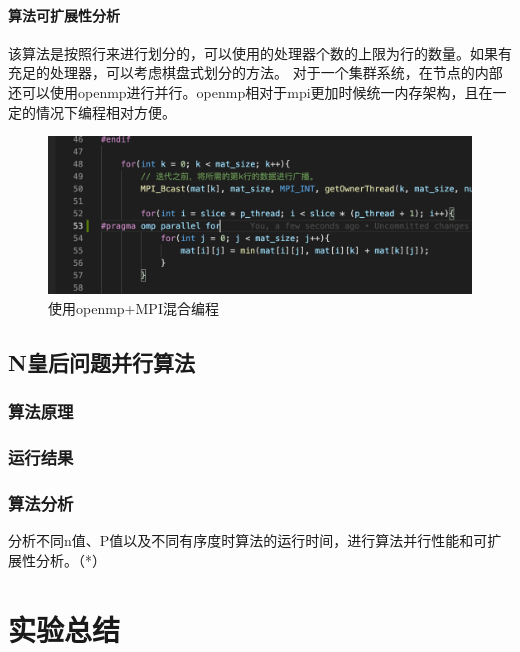 \documentclass[10pt]{article}
\begin{document}
\paragraph{算法可扩展性分析}

该算法是按照行来进行划分的，可以使用的处理器个数的上限为行的数量。如果有充足的处理器，可以考虑棋盘式划分的方法。
对于一个集群系统，在节点的内部还可以使用openmp进行并行。openmp相对于mpi更加时候统一内存架构，且在一定的情况下编程相对方便。

\begin{figure}[htbp]
    \centering
    \includegraphics[width=.8\textwidth]{assets/openmp+MPI.png}
    \caption{使用openmp+MPI混合编程}
    \label{使用openmp+MPI混合编程}
\end{figure}


\subsection{N皇后问题并行算法}

\subsubsection{算法原理}

\subsubsection{运行结果}

\subsubsection{算法分析}
分析不同n值、P值以及不同有序度时算法的运行时间，进行算法并行性能和可扩展性分析。（*）

\section{实验总结}
\end{document}
